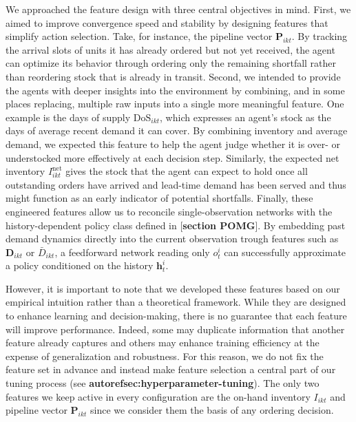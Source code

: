 We approached the feature design with three central objectives in mind. First, we aimed to improve convergence speed and stability by designing features that simplify action selection. Take, for instance, the pipeline vector $\mathbf{P}_{ikt}$. By tracking the arrival slots of units it has already ordered but not yet received, the agent can optimize its behavior through ordering only the remaining shortfall rather than reordering stock that is already in transit. Second, we intended to provide the agents with deeper insights into the environment by combining, and in some places replacing, multiple raw inputs into a single more meaningful feature. One example is the days of supply $\mathrm{DoS}_{ikt}$, which expresses an agent's stock as the days of average recent demand it can cover. By combining inventory and average demand, we expected this feature to help the agent judge whether it is over- or understocked more effectively at each decision step. Similarly, the expected net inventory $I_{ikt}^{\mathrm{net}}$ gives the stock that the agent can expect to hold once all outstanding orders have arrived and lead-time demand has been served and thus might function as an early indicator of potential shortfalls. Finally, these engineered features allow us to reconcile single-observation networks with the history-dependent policy class defined in [\textbf{section POMG}]. By embedding past demand dynamics directly into the current observation trough features such as $\mathbf{D}_{ikt}$ or $\bar{D}_{ikt}$, a feedforward network reading only $o^i_t$ can successfully approximate a policy conditioned on the history $\mathbf{h}_t^i$.

However, it is important to note that we developed these features based on our empirical intuition rather than a theoretical framework. While they are designed to enhance learning and decision-making, there is no guarantee that each feature will improve performance. Indeed, some may duplicate information that another feature
already captures and others may enhance training efficiency at the expense of generalization and robustness. For this reason, we do not fix the feature set in advance and instead make feature selection a central part of our tuning process (see \textbf{autoref{sec:hyperparameter-tuning}}). The only two features we keep active in every configuration are the on-hand inventory $I_{ikt}$ and pipeline vector $\mathbf{P}_{ikt}$ since we consider them the basis of any ordering decision.

